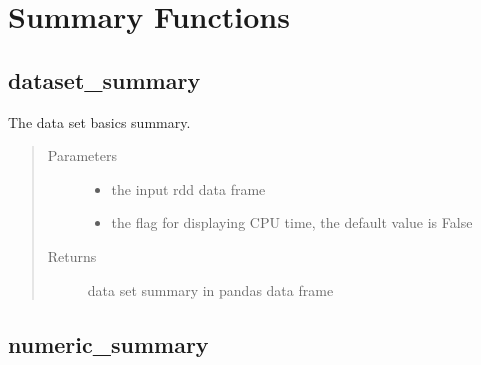 \documentclass[letterpaper,12pt,english]{sphinxmanual}
\begin{document}
\section{Summary Functions}
\label{\detokenize{basics:summary-functions}}

\subsection{dataset\_summary}
\label{\detokenize{basics:dataset-summary}}

\begin{fulllineitems}
The data set basics summary.
\begin{quote}\begin{description}
\item[{Parameters}] \leavevmode\begin{itemize}
\item {} 
 \textendash{} the input rdd data frame

\item {} 
 \textendash{} the flag for displaying CPU time, the default value is False

\end{itemize}

\item[{Returns}] \leavevmode
data set summary in pandas data frame

\end{description}\end{quote}

\end{fulllineitems}



\subsection{numeric\_summary}
\label{\detokenize{basics:numeric-summary}}
\end{document}
